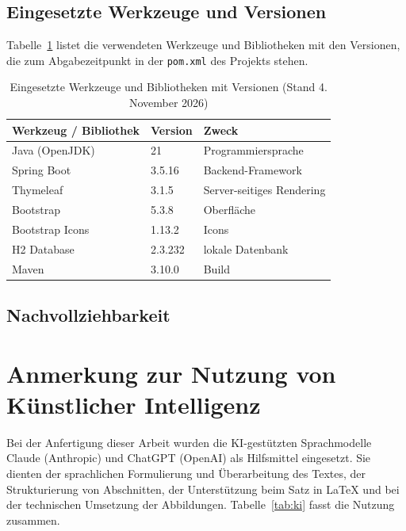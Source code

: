 \documentclass[12pt,a4paper]{scrreprt}
\begin{document}
\section{Eingesetzte Werkzeuge und Versionen}
Tabelle~\ref{tab:versionen} listet die verwendeten Werkzeuge und Bibliotheken mit den Versionen, die zum Abgabezeitpunkt in der \texttt{pom.xml} des Projekts stehen.
\begin{table}[!htb]
    \centering
    \begin{tabular}{lll}
        \toprule
        Werkzeug / Bibliothek & Version & Zweck \\
        \midrule
        Java (OpenJDK) & 21 & Programmiersprache \\
        Spring Boot & 3.5.16 & Backend-Framework \\
        Thymeleaf & 3.1.5 & Server-seitiges Rendering \\
        Bootstrap & 5.3.8 & Oberfläche \\
        Bootstrap Icons & 1.13.2 & Icons \\
        H2 Database & 2.3.232 & lokale Datenbank \\
        Maven & 3.10.0 & Build \\
        \bottomrule
    \end{tabular}
    \caption{Eingesetzte Werkzeuge und Bibliotheken mit Versionen (Stand 4. November 2026)}
    \label{tab:versionen}
\end{table}
\section{Nachvollziehbarkeit}


\clearpage
\printbibliography[heading=bibintoc]

\clearpage
\chapter*{Anmerkung zur Nutzung von Künstlicher Intelligenz}
\setcounter{table}{0}
\renewcommand{\thetable}{K\arabic{table}}
Bei der Anfertigung dieser Arbeit wurden die KI-gestützten Sprachmodelle Claude (Anthropic) und ChatGPT (OpenAI) als Hilfsmittel eingesetzt. Sie dienten der sprachlichen Formulierung und Überarbeitung des Textes, der Strukturierung von Abschnitten, der Unterstützung beim Satz in LaTeX und bei der technischen Umsetzung der Abbildungen. Tabelle~\ref{tab:ki} fasst die Nutzung zusammen.
\end{document}
